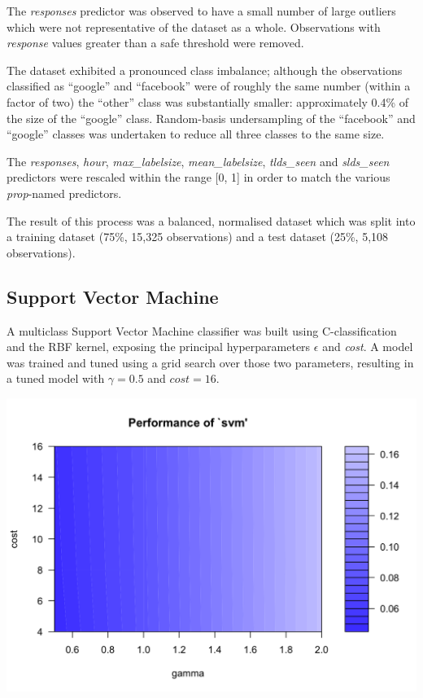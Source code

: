 \documentclass[conference]{IEEEtran}
\begin{document}
The \emph{responses} predictor was observed to have a small number of
large outliers which were not representative of the dataset as a whole.
Observations with \emph{response} values greater than a safe threshold
were removed.

The dataset exhibited a pronounced class imbalance; although the
observations classified as ``google'' and ``facebook'' were of roughly
the same number (within a factor of two) the ``other'' class was
substantially smaller: approximately 0.4\% of the size of the ``google''
class. Random-basis undersampling of the ``facebook'' and ``google''
classes was undertaken to reduce all three classes to the same size.

The \emph{responses}, \emph{hour}, \emph{max\_labelsize},
\emph{mean\_labelsize}, \emph{tlds\_seen} and \emph{slds\_seen}
predictors were rescaled within the range {[}0, 1{]} in order to match
the various \emph{prop}-named predictors.

The result of this process was a balanced, normalised dataset which was
split into a training dataset (75\%, 15,325 observations) and a test
dataset (25\%, 5,108 observations).

\subsection{Support Vector Machine}\label{sec:support-vector-machine}

A multiclass Support Vector Machine classifier was built using
C-classification and the RBF kernel, exposing the principal
hyperparameters \(\epsilon\) and \emph{cost}. A model was trained and
tuned using a grid search over those two parameters, resulting in a
tuned model with \(\gamma = 0.5\) and \(cost = 16\).

\begin{center}\includegraphics[width=1\linewidth]{SVM-tuning} \end{center}
\end{document}
